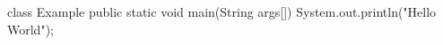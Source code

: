 class Example
{
 public static void main(String args[])
 {
   System.out.println("Hello World");
  }
} 